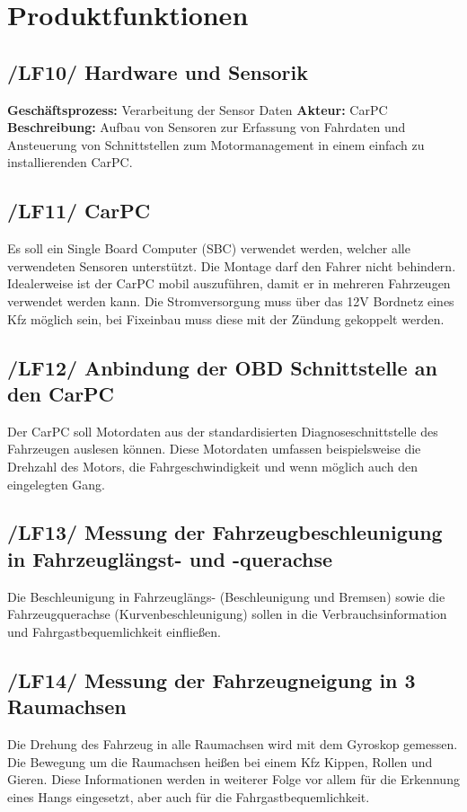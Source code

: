 \chapter{Produktfunktionen}

\section{/LF10/ Hardware und Sensorik}
\textbf{Geschäftsprozess:}	Verarbeitung der Sensor Daten
\newline
\textbf{Akteur:}		CarPC
\newline
\textbf{Beschreibung:}	Aufbau von Sensoren zur Erfassung von Fahrdaten und Ansteuerung von Schnittstellen zum Motormanagement in einem einfach zu installierenden CarPC.

\section{/LF11/ CarPC}
Es soll ein Single Board Computer (SBC) verwendet werden, welcher alle verwendeten Sensoren unterstützt. Die Montage darf den Fahrer nicht behindern. Idealerweise ist der CarPC mobil auszuführen, damit er in mehreren Fahrzeugen verwendet werden kann. Die Stromversorgung muss über das 12V Bordnetz eines Kfz möglich sein, bei Fixeinbau muss diese mit der Zündung gekoppelt werden.

\section{/LF12/ Anbindung der OBD Schnittstelle an den CarPC}
Der CarPC soll Motordaten aus der standardisierten Diagnoseschnittstelle des Fahrzeugen auslesen können. Diese Motordaten umfassen beispielsweise die Drehzahl des Motors, die Fahrgeschwindigkeit und wenn möglich auch den eingelegten Gang.

\section{/LF13/ Messung der Fahrzeugbeschleunigung in Fahrzeuglängst- und -querachse}
Die Beschleunigung in Fahrzeuglängs- (Beschleunigung und Bremsen) sowie die Fahrzeugquerachse (Kurvenbeschleunigung) sollen in die Verbrauchsinformation und Fahrgastbequemlichkeit einfließen.

\section{/LF14/ Messung der Fahrzeugneigung in 3 Raumachsen}
Die Drehung des Fahrzeug in alle Raumachsen wird mit dem Gyroskop gemessen. Die Bewegung um die Raumachsen heißen bei einem Kfz Kippen, Rollen und Gieren. Diese Informationen werden in weiterer Folge vor allem für die Erkennung eines Hangs eingesetzt, aber auch für die Fahrgastbequemlichkeit.

